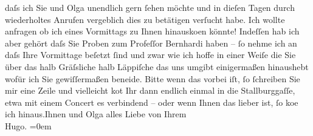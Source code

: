 \begin{ledgroupsized}[t]{13cm}
               daſs ich Sie und Olga unendlich gern ſehen möchte
               und in dieſen Tagen durch wiederholtes Anrufen vergeblich dies zu betätigen verſucht
               habe. Ich wollte anfragen ob ich eines Vormittags zu Ihnen hinausko{\geminationm}en könnte! Indeſſen hab ich aber gehört daſs Sie {\pb}Proben zum Profeſſor Bernhardi haben – ſo nehme ich an daſs Ihre Vormittage
               beſetzt ſind und zwar wie ich hoffe in einer Weiſe die Sie über das halb Gräſsliche
               halb Läppiſche das uns umgibt einigermaßen hinaushebt wofür ich Sie gewiſſermaßen
               beneide.\pend
           \pstart
           Bitte wenn das vorbei iſt, {\pb}ſo
               ſchreiben Sie mir eine Zeile und vielleicht ko{\geminationm}t Ihr
               dann endlich einmal in die Stallburggaſſe, etwa
               mit einem Concert es verbindend – oder wenn Ihnen das lieber ist, ſo ko{\geminationm}e ich hinaus.\hspace*{1.5em}Ihnen
               und Olga alles Liebe \pend
           \pstart
           von Ihrem{\\[\baselineskip]}\spacefill\mbox{Hugo.}\pend
           \leftskip=0em{}\endnumbering{}\end{ledgroupsized}  \newcommand{\dateiname}{L02313}\newcommand{\titel}{Hugo von Hofmannsthal an Arthur Schnitzler, [Anfang Dezember 1918]}\newcommand{\editorInnen}{Martin Anton Müller und Gerd-Hermann Susen}
      